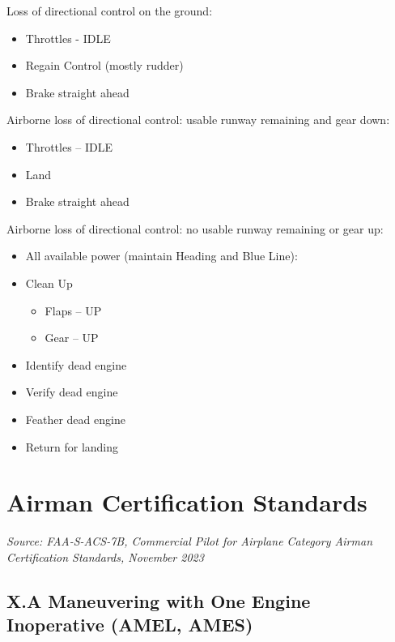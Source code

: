 \bfseries{

Loss of directional control on the ground:
\begin{itemize}
    \item Throttles - IDLE
    \item Regain Control (mostly rudder)
    \item Brake straight ahead
\end{itemize}

Airborne loss of directional control: usable runway remaining and gear down:
\begin{itemize}
    \item Throttles – IDLE
    \item Land
    \item Brake straight ahead
\end{itemize}

Airborne loss of directional control: no usable runway remaining or gear up:
\begin{itemize}
    \item All available power (maintain Heading and Blue Line):
    \item Clean Up
        \begin{itemize}
            \item[\ding{226}] Flaps – UP
            \item[\ding{226}] Gear – UP
        \end{itemize}
    \item Identify dead engine
    \item Verify dead engine
    \item Feather dead engine
    \item Return for landing
\end{itemize}

\section{Airman Certification Standards}

\emph{Source: FAA-S-ACS-7B, Commercial Pilot for Airplane Category Airman Certification Standards, November 2023} 

\subsection{X.A Maneuvering with One Engine Inoperative (AMEL, AMES)}


}
